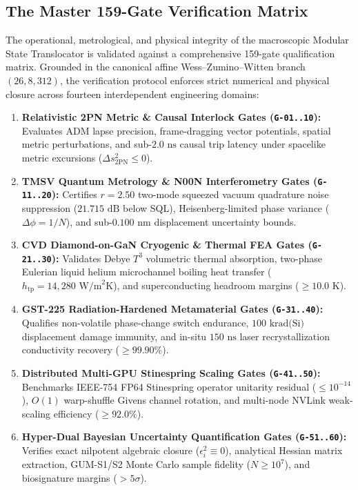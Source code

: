 \documentclass[11pt,onecolumn]{article}
\begin{document}
\subsection{The Master 159-Gate Verification Matrix}
\label{sec:master_matrix}
The operational, metrological, and physical integrity of the macroscopic Modular State Translocator is validated against a comprehensive 159-gate qualification matrix. Grounded in the canonical affine Wess--Zumino--Witten branch $(26, 8, 312)$, the verification protocol enforces strict numerical and physical closure across fourteen interdependent engineering domains:
\begin{enumerate}
    \item \textbf{Relativistic 2PN Metric \& Causal Interlock Gates (\texttt{G-01..10}):} Evaluates ADM lapse precision, frame-dragging vector potentials, spatial metric perturbations, and sub-$2.0\text{ ns}$ causal trip latency under spacelike metric excursions ($\Delta s^2_{\mathrm{2PN}} \le 0$).
    \item \textbf{TMSV Quantum Metrology \& N00N Interferometry Gates (\texttt{G-11..20}):} Certifies $r = 2.50$ two-mode squeezed vacuum quadrature noise suppression ($21.715\text{ dB}$ below SQL), Heisenberg-limited phase variance ($\Delta\phi = 1/N$), and sub-$0.100\text{ nm}$ displacement uncertainty bounds.
    \item \textbf{CVD Diamond-on-GaN Cryogenic \& Thermal FEA Gates (\texttt{G-21..30}):} Validates Debye $T^3$ volumetric thermal absorption, two-phase Eulerian liquid helium microchannel boiling heat transfer ($h_{\mathrm{tp}} = 14{,}280\text{ W/m}^2\text{K}$), and superconducting headroom margins ($\ge 10.0\text{ K}$).
    \item \textbf{GST-225 Radiation-Hardened Metamaterial Gates (\texttt{G-31..40}):} Qualifies non-volatile phase-change switch endurance, $100\text{ krad(Si)}$ displacement damage immunity, and in-situ $150\text{ ns}$ laser recrystallization conductivity recovery ($\ge 99.90\%$).
    \item \textbf{Distributed Multi-GPU Stinespring Scaling Gates (\texttt{G-41..50}):} Benchmarks IEEE-754 FP64 Stinespring operator unitarity residual ($\le 10^{-14}$), $O(1)$ warp-shuffle Givens channel rotation, and multi-node NVLink weak-scaling efficiency ($\ge 92.0\%$).
    \item \textbf{Hyper-Dual Bayesian Uncertainty Quantification Gates (\texttt{G-51..60}):} Verifies exact nilpotent algebraic closure ($\epsilon_i^2 \equiv 0$), analytical Hessian matrix extraction, GUM-S1/S2 Monte Carlo sample fidelity ($N \ge 10^7$), and biosignature margins ($> 5\sigma$).

\end{enumerate}
\end{document}
